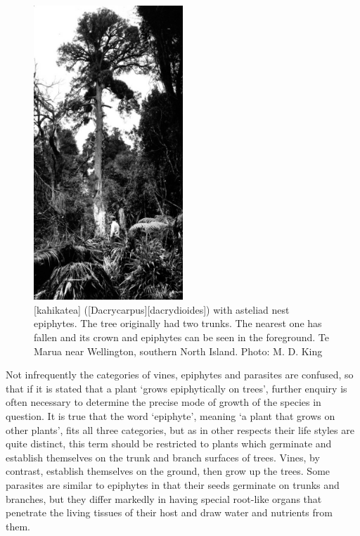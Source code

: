 \begin{figure}
	\centering
	\includegraphics[width=0.5\textwidth]{graphics/fig_026}
	\caption[Kahikatea with asteliad nest epiphytes]{[kahikatea] ([Dacrycarpus][dacrydioides]) with asteliad nest epiphytes.
	The tree originally had two trunks.
	The nearest one has fallen and its crown and epiphytes can be seen in the foreground.
	Te Marua near Wellington, southern North Island.
	Photo: M. D. King}%
	\label{fig:26kahikatea}
\end{figure}

Not infrequently the categories of vines, epiphytes and parasites are confused, so that if it is stated that a plant `grows epiphytically on trees', further enquiry is often necessary to determine the precise mode of growth of the species in question.
It is true that the word `epiphyte', meaning `a plant that grows on other plants', fits all three categories, but as in other respects their life styles are quite distinct, this term should be restricted to plants which germinate and establish themselves on the trunk and branch surfaces of trees.
Vines, by contrast, establish themselves on the ground, then grow up the trees.
Some parasites are similar to epiphytes in that their seeds germinate on trunks and branches, but they differ markedly in having special root-like organs that penetrate the living tissues of their host and draw water and nutrients from them.

